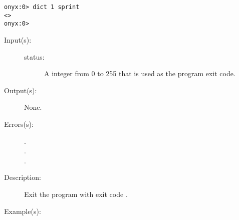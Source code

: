 \begin{description}
\begin{description}
\begin{verbatim}
onyx:0> dict 1 sprint
<>
onyx:0>
		\end{verbatim}
	\end{description}
\label{systemdict:die}
\item[{\onyxop{status}{die}{--}}: ]
	\begin{description}\item[]
	\item[Input(s): ]
		\begin{description}\item[]
		\item[status: ]
			A integer from 0 to 255 that is used as the program exit
			code.
		\end{description}
	\item[Output(s): ] None.
	\item[Errors(s): ]
		\begin{description}\item[]
		\item[.]
		\item[.]
		\item[.]
		\end{description}
	\item[Description: ]
		Exit the program with exit code .
	\item[Example(s): ]\begin{verbatim}


\end{verbatim}
\end{description}
\end{description}
